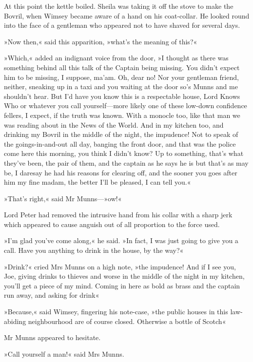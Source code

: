 At this point the kettle boiled. Sheila was taking it off the stove to make the Bovril, when Wimsey became aware of a hand on his coat-collar. He looked round into the face of a gentleman who appeared not to have shaved for several days.

»Now then,« said this apparition, »what's the meaning of this?«

»Which,« added an indignant voice from the door, »I thought as there was something behind all this talk of the Captain being missing. You didn't expect him to be missing, I suppose, ma'am. Oh, dear no! Nor your gentleman friend, neither, sneaking up in a taxi and you waiting at the door so's Munns and me shouldn't hear. But I'd have you know this is a respectable house, Lord Knows Who or whatever you call yourself—more likely one of these low-down confidence fellers, I expect, if the truth was known. With a monocle too, like that man we was reading about in the News of the World. And in my kitchen too, and drinking my Bovril in the middle of the night, the impudence! Not to speak of the goings-in-and-out all day, banging the front door, and that was the police come here this morning, you think I didn't know? Up to something, that's what they've been, the pair of them, and the captain as he says he is but that's as may be, I daresay he had his reasons for clearing off, and the sooner you goes after him my fine madam, the better I'll be pleased, I can tell you.«

»That's right,« said Mr Munns—»ow!«

Lord Peter had removed the intrusive hand from his collar with a sharp jerk which appeared to cause anguish out of all proportion to the force used.

»I'm glad you've come along,« he said. »In fact, I was just going to give you a call. Have you anything to drink in the house, by the way?«

»Drink?« cried Mrs Munns on a high note, »the impudence! And if I see you, Joe, giving drinks to thieves and worse in the middle of the night in my kitchen, you'll get a piece of my mind. Coming in here as bold as brass and the captain run away, and asking for drink\longdash«

»Because,« said Wimsey, fingering his note-case, »the public houses in this law-abiding neighbourhood are of course closed. Otherwise a bottle of Scotch\longdash«

Mr Munns appeared to hesitate.

»Call yourself a man!« said Mrs Munns.

